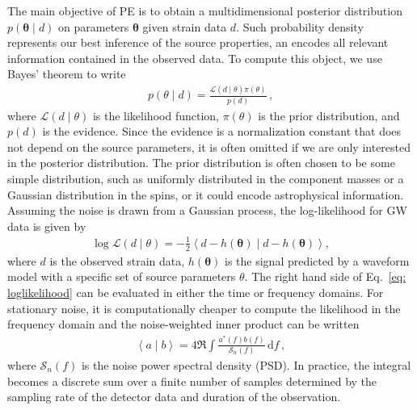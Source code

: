 \documentclass[twocolumn]{aastex631}
\begin{document}
The main objective of PE is to obtain a multidimensional posterior distribution
$p(\mathbf{\theta} \mid d)$ on parameters $\mathbf{\theta}$ given strain
data $d$.  Such probability density represents our best inference of
the source properties, an encodes all relevant information contained in the
observed data.
To compute this object, we use Bayes' theorem to write
\begin{align} \label{eq: bayes}
    p(\theta \mid d) = \frac{\mathcal{L}(d \mid \theta)\pi(\theta)}{p(d)}\, ,
\end{align}
where $\mathcal{L}(d \mid \theta)$ is the likelihood function, $\pi(\theta)$ is
the prior distribution, and $p(d)$ is the evidence. Since the evidence is a
normalization constant that does not depend on the source parameters, it is
often omitted if we are only interested in the posterior distribution. The prior
distribution is often chosen to be some simple distribution, such as uniformly
distributed in the component masses or a Gaussian distribution in the spins, or
it could encode astrophysical information. Assuming the noise is drawn from a
Gaussian process, the log-likelihood for GW data is given by
\begin{align}
    \log{\mathcal{L}(d \mid \theta)} = -\frac{1}{2} \left\langle d-h(\mathbf{\theta}) \mid d-h(\mathbf{\theta})\right\rangle,
\label{eq: loglikelihood}
\end{align}
where $d$ is the observed strain data, $h(\mathbf{\theta})$ is the signal
predicted by a waveform model with a specific set of source parameters $\theta$.
The right hand side of Eq.~\eqref{eq: loglikelihood} can be evaluated in either
the time or frequency domains. For stationary noise, it is computationally
cheaper to compute the likelihood in the frequency domain and the
noise-weighted inner product can be written 
\begin{align}
    \left\langle a \mid b\right\rangle = 4 \Re \int \frac{a^*(f)b(f)}{\mathcal{S}_n(f)}\, \mathrm{d}f \, ,
\label{eq: innerproduct}
\end{align}
where $\mathcal{S}_n(f)$ is the noise power spectral density (PSD).
In practice, the integral becomes a discrete sum over a finite number of
samples determined by the sampling rate of the detector data and duration of
the observation.
\end{document}
